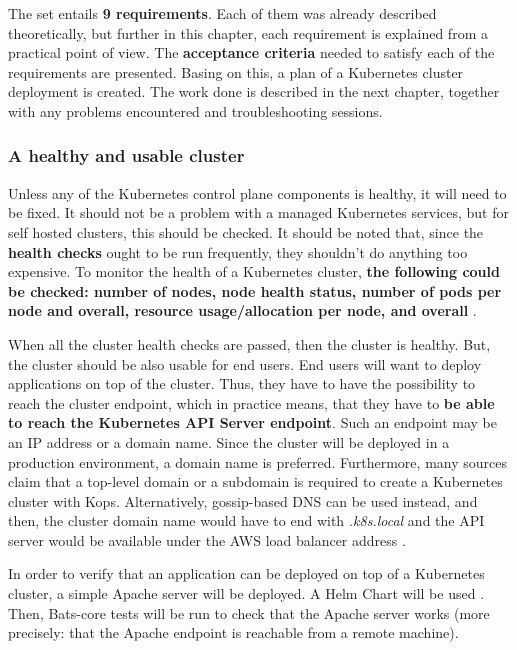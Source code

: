 The set entails \textbf{9 requirements}. Each of them was already described theoretically, but further in this chapter, each requirement is explained from a practical point of view. The \textbf{acceptance criteria} needed to satisfy each of the requirements are presented. Basing on this, a plan of a Kubernetes cluster deployment is created. The work done is described in the next chapter, together with any problems encountered and troubleshooting sessions.

\subsubsection{A healthy and usable cluster}
\label{A healthy cluster}

Unless any of the Kubernetes control plane components is healthy, it will need to be fixed. It should not be a problem with a managed Kubernetes services, but for self hosted clusters, this should be checked. It should be noted that, since the \textbf{health checks} ought to be run frequently, they shouldn't do anything too expensive. To monitor the health of a Kubernetes cluster, \textbf{the following could be checked: number of nodes, node health status, number of pods per node and overall, resource usage/allocation per node, and overall} \cite{book-cndwk}.

When all the cluster health checks are passed, then the cluster is healthy. But, the cluster should be also usable for end users. End users will want to deploy applications on top of the cluster. Thus, they have to have the possibility to reach the cluster endpoint, which in practice means, that they have to \textbf{be able to reach the Kubernetes API Server endpoint}. Such an endpoint may be an IP address or a domain name. Since the cluster will be deployed in a production environment, a domain name is preferred. Furthermore, many sources claim that a top-level domain or a subdomain is required to create a Kubernetes cluster with Kops. Alternatively, gossip-based DNS can be used instead, and then, the cluster domain name would have to end with \textit{.k8s.local} and the API server would be available under the AWS load balancer address \cite{kops-howto-aws} \cite{online-kops-aws} \cite{kops-howto-k8s} \cite{kops-gossip}.

In order to verify that an application can be deployed on top of a Kubernetes cluster, a simple Apache server will be deployed. A Helm Chart will be used \cite{helm-apache}. Then, Bats-core tests will be run to check that the Apache server works (more precisely: that the Apache endpoint is reachable from a remote machine).

